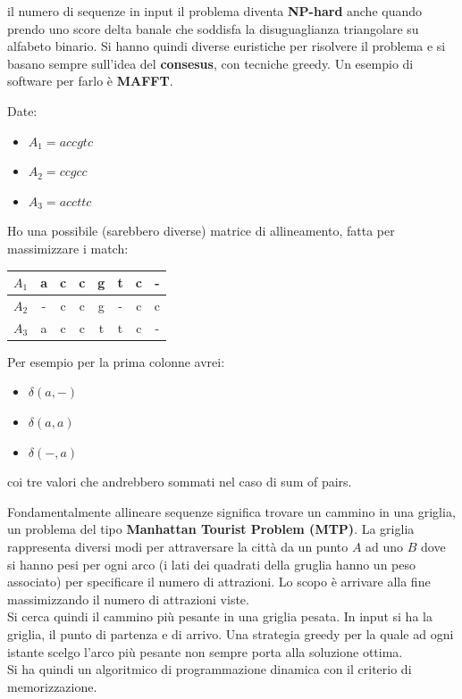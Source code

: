 \documentclass[a4paper,12pt, oneside]{book}
\begin{document}
il numero di sequenze in input il problema diventa \textbf{NP-hard} anche quando
prendo uno score delta banale che soddisfa la disuguaglianza triangolare su
alfabeto binario. Si hanno quindi diverse euristiche per risolvere il problema e
si basano sempre sull'idea del \textbf{consesus}, con tecniche greedy. Un
esempio di software per farlo è \textbf{MAFFT}.
\begin{esempio}
  Date:
  \begin{itemize}
    \item $A_1=accgtc$
    \item $A_2=ccgcc$
    \item $A_3=accttc$
  \end{itemize}
  Ho una possibile (sarebbero diverse) matrice di allineamento, fatta per
  massimizzare i match:
  \begin{table}[H]
    \centering
    \begin{tabular}{c||c|c|c|c|c|c|c|}
      $A_1$& a&c&c&g&t&c&-\\
      \hline
      $A_2$& -&c &c & g&-& c&c\\
      \hline
      $A_3$&a&c&c&t&t&c&-
    \end{tabular}
  \end{table}
  Per esempio per la prima colonne avrei:
  \begin{itemize}
    \item $\delta(a,-)$
    \item $\delta(a,a)$
    \item $\delta(-,a)$
  \end{itemize}
  coi tre valori che andrebbero sommati nel caso di sum of pairs.
\end{esempio}
Fondamentalmente allineare sequenze significa trovare un cammino in una griglia,
un problema del tipo \textbf{Manhattan Tourist Problem (MTP)}. La griglia
rappresenta diversi modi per attraversare la città da un punto $A$ ad uno $B$
dove si hanno pesi per ogni arco (i lati dei quadrati della gruglia hanno un
peso associato) per specificare il numero di attrazioni. Lo
scopo è arrivare alla fine massimizzando il numero di attrazioni viste.\\
Si cerca quindi il cammino più pesante in una griglia pesata. In input si ha la
griglia, il punto di partenza e di arrivo. Una strategia greedy per la quale ad
ogni istante scelgo l'arco più pesante non sempre porta alla soluzione ottima.\\
Si ha quindi un algoritmico di programmazione dinamica con il criterio di
memorizzazione. \\
\end{document}
